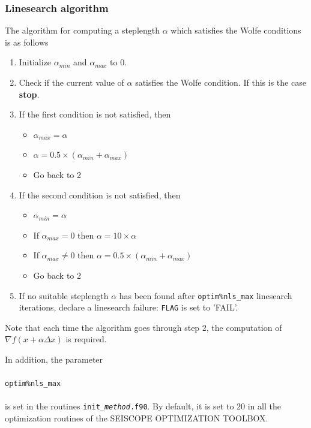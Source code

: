 \documentclass[a4paper,twoside,final,onecolumn,11pt,openright]{article}
\begin{document}
\subsubsection{Linesearch algorithm}
The algorithm for computing a steplength $\alpha$ which satisfies the Wolfe conditions is as follows
\begin{enumerate}
 \item Initialize $\alpha_{min}$ and $\alpha_{max}$ to 0.
 \item Check if the current value of $\alpha$ satisfies the Wolfe condition. If this is the case \textbf{stop}. 
 \item If the first condition is not satisfied, then 
\begin{itemize}
 \item $\alpha_{max}=\alpha$
 \item $\alpha=0.5\times(\alpha_{min}+\alpha_{max})$
 \item Go back to 2
\end{itemize}
\item If the second condition is not satisfied, then 
 \begin{itemize}
  \item  $\alpha_{min}=\alpha$
  \item If $\alpha_{max}=0$ then $\alpha=10\times \alpha$
  \item If $\alpha_{max}\ne 0$ then $\alpha =0.5\times(\alpha_{min}+\alpha_{max})$
   \item Go back to 2
 \end{itemize}       
\item If no suitable steplength $\alpha$ has been found after \texttt{optim\%nls\_max} linesearch iterations, declare a linesearch failure: \texttt{FLAG} is set to 'FAIL'.
\end{enumerate}
Note that each time the algorithm goes through step 2, the computation of $\nabla f(x+\alpha \Delta x)$ is required. 

In addition, the parameter 
\\
\\
\texttt{optim\%nls\_max}
\\
\\
is set in the routines \texttt{init\_\textit{method}.f90}. By default, it is set to $20$ in all the optimization routines of the SEISCOPE OPTIMIZATION TOOLBOX.  
\end{document}
